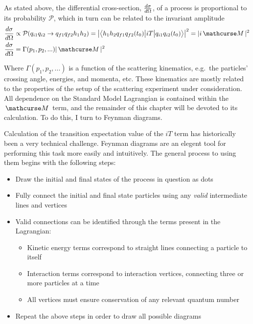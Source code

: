     As stated above, the differential cross-section, $\frac{d\sigma}{d\Omega}$,
        of a process is proportional to its probability $\mathcal{P}$,
        which in turn can be related to the invariant amplitude
    \begin{equation} \begin{split}
        \dXsec &\propto \mathcal{P}( q_{i1} q_{i2} \rightarrow q_{f1} q_{f2} h_1 h_2 ) 
            = \left| \TbraketA{ h_1 h_2 q_{f1} q_{f2} (t_0)}{iT}{q_{i1} q_{i2} (t_0)} \right|^2 
            = |i \invAmp|^2 
        \\\dXsec &= \Gamma(p_1, p_2, ...) |\invAmp|^2
    \end{split} \end{equation}

    Where $\Gamma(p_1, p_2, ...)$ is a function of the scattering kinematics,
        e.g.\ the particles' crossing angle, energies, and momenta, etc.
    These kinematics are mostly related to the properties of the setup of the scattering experiment under consideration.
    All dependence on the Standard Model Lagrangian is contained within the $\invAmp$ term,
        and the remainder of this chapter will be devoted to its calculation.
    To do this, I turn to Feynman diagrams.

    Calculation of the transition expectation value of the $iT$ term has historically been a very technical challenge.
    Feynman diagrams are an elegent tool for performing this task more easily and intuitively.
    The general process to using them begins with the following steps:
    \begin{itemize}
        \item Draw the initial and final states of the process in question as dots
        \item Fully connect the initial and final state particles using any \textit{valid} intermediate lines and vertices
        \item Valid connections can be identified through the terms present in the Lagrangian:
        \begin{itemize}
            \item Kinetic energy terms correspond to straight lines connecting a particle to itself
            \item Interaction terms correspond to interaction vertices, connecting three or more particles at a time
            \item All vertices must ensure conservation of any relevant quantum number
        \end{itemize}
        \item Repeat the above steps in order to draw all possible diagrams
    \end{itemize}

